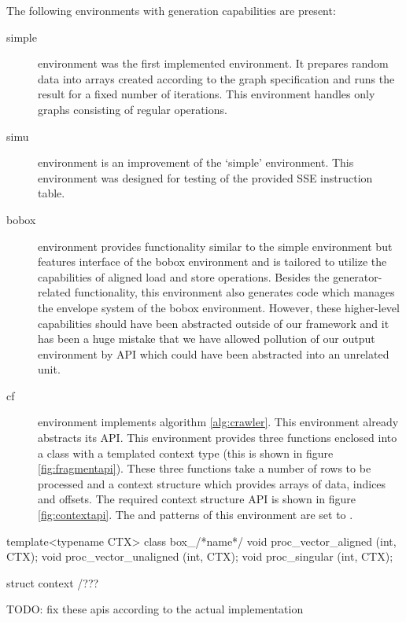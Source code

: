 The following environments with generation capabilities are present:
\begin{description}
  \item[simple] environment was the first implemented environment. It prepares random data into arrays created according to the graph specification and runs the result for a fixed number of iterations. This environment handles only graphs consisting of regular operations.

  \item[simu] environment is an improvement of the `simple' environment. This environment was designed for testing of the provided SSE instruction table.

  \item[bobox] environment provides functionality similar to the simple environment but features interface of the bobox environment and is tailored to utilize the capabilities of aligned load and store operations. Besides the generator-related functionality, this environment also generates code which manages the envelope system of the bobox environment. However, these higher-level capabilities should have been abstracted outside of our framework and it has been a huge mistake that we have allowed pollution of our output environment by API which could have been abstracted into an unrelated unit.

  \item[cf] environment implements algorithm \ref{alg:crawler}. This environment already abstracts its API. This environment provides three functions enclosed into a class with a templated context type (this is shown in figure \ref{fig:fragmentapi}). These three functions take a number of rows to be processed and a context structure which provides arrays of data, indices and offsets. The required context structure API is shown in figure \ref{fig:contextapi}. The  and  patterns of this environment are set to . 
\end{description}

\mybeginfig
\begin{code}
template<typename CTX>
class box_/*name*/
{
  void proc_vector_aligned   (int, CTX);
  void proc_vector_unaligned (int, CTX);
  void proc_singular         (int, CTX);
}
\end{code}


\mybeginfig
\begin{code}
struct context
{
  /???
}
\end{code}
TODO: fix these apis according to the actual implementation 


